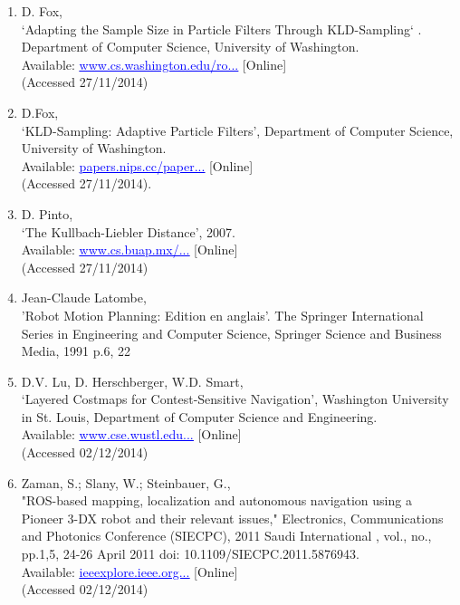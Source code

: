 \documentclass{article}
\begin{document}
\begin{multicols}{2}
\begin{enumerate}
\item D. Fox,
\\‘Adapting the Sample Size in Particle Filters Through KLD-Sampling‘ . Department of Computer Science, University of Washington.
\\Available: \href{www.cs.washington.edu/robotics/mcl/postscripts/adaptive-ijrr-2003.pdf}{\textcolor{blue}{\uline{www.cs.washington.edu/ro...}}} [Online]
\\(Accessed 27/11/2014)

\item D.Fox,
\\‘KLD-Sampling: Adaptive Particle Filters’, Department of Computer Science, University of Washington.
\\Available: \href{papers.nips.cc/paper/1998-kld-sampling-adaptive-particle-filters.pdf}{\textcolor{blue}{\uline{papers.nips.cc/paper...}}} [Online]
\\(Accessed 27/11/2014).

\item D. Pinto,
\\‘The Kullbach-Liebler Distance’, 2007.
\\Available: \href{www.cs.buap.mx/~dpinto/research/CICLing07_1/Pinto06c/node2.html}{\textcolor{blue}{\uline{www.cs.buap.mx/...}}} [Online]
\\(Accessed 27/11/2014)

\item Jean-Claude Latombe,
\\'Robot Motion Planning: Edition en anglais'. The Springer International Series in Engineering and Computer Science, Springer Science and Business Media, 1991 p.6, 22

\item D.V. Lu, D. Herschberger, W.D. Smart,
\\‘Layered Costmaps for Contest-Sensitive Navigation’, Washington University in St. Louis, Department of Computer Science and Engineering.
\\Available: \href{www.cse.wustl.edu/~dvl1/publications/LayeredCostmaps.pdf}{\textcolor{blue}{\uline{www.cse.wustl.edu...}}} [Online]
\\(Accessed 02/12/2014)

\item Zaman, S.; Slany, W.; Steinbauer, G.,
\\"ROS-based mapping, localization and autonomous navigation using a Pioneer 3-DX robot and their relevant issues," Electronics, Communications and Photonics Conference (SIECPC), 2011 Saudi International , vol., no., pp.1,5, 24-26 April 2011 doi: 10.1109/SIECPC.2011.5876943. 
\\Available: \href{ieeexplore.ieee.org/xpls/icp.jsp?arnumber=5876943}{\textcolor{blue}{\uline{ieeexplore.ieee.org...}}} [Online]
\\(Accessed 02/12/2014)


\end{enumerate}
\end{multicols}
\end{document}
